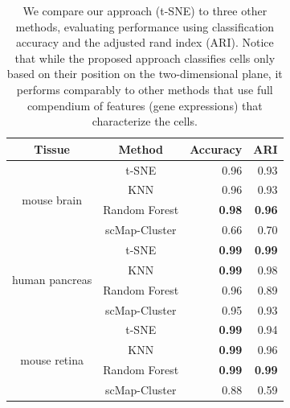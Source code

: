 \documentclass[runningheads]{llncs}
\begin{document}
\begin{table}[ht]
\centering
  \setlength\tabcolsep{6pt}
  \begin{tabular}{c c r r}
  \toprule
  Tissue & Method & Accuracy & ARI \\
  \toprule
  \multirow{4}{*}{mouse brain} & t-SNE & 0.96 & 0.93 \\
   & KNN & 0.96 & 0.93 \\
   & Random Forest & \textbf{0.98} & \textbf{0.96} \\
   & scMap-Cluster & 0.66 & 0.70 \\
  \midrule
  \multirow{4}{*}{human pancreas} & t-SNE & \textbf{0.99} & \textbf{0.99} \\
   & KNN & \textbf{0.99} & 0.98 \\
   & Random Forest & 0.96 & 0.89 \\
   & scMap-Cluster & 0.95 & 0.93 \\
  \midrule
  \multirow{4}{*}{mouse retina} & t-SNE & \textbf{0.99} & 0.94 \\
   & KNN & \textbf{0.99} & 0.96 \\
   & Random Forest & \textbf{0.99} & \textbf{0.99} \\
   & scMap-Cluster & 0.88 & 0.59 \\
  \bottomrule
  \end{tabular}
  \caption{We compare our approach (t-SNE) to three other methods, evaluating
    performance using classification accuracy and the adjusted rand index (ARI).
    Notice that while the proposed approach classifies cells only based on their
    position on the two-dimensional plane, it performs comparably to other
    methods that use full compendium of features (gene expressions) that
    characterize the cells.}
  \label{tab:scores}
\end{table}
\end{document}
